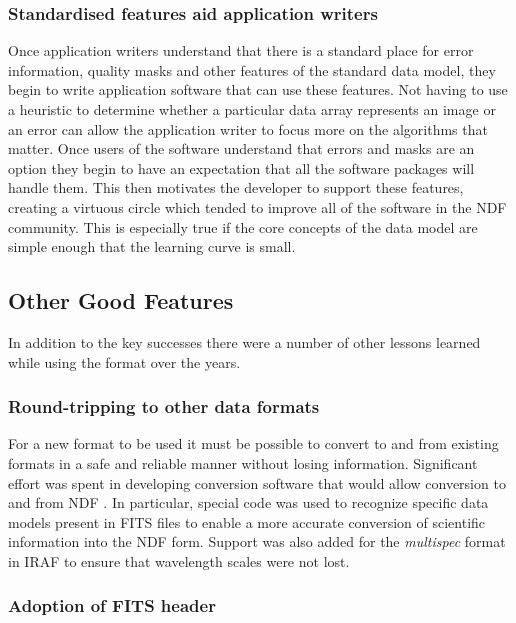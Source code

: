 \documentclass[final,authoryear,5p,times,twocolumn]{elsarticle}
\begin{document}
\subsubsection{Standardised features aid application writers}

Once application writers understand that there is a standard place for
error information, quality masks and other features of the standard
data model, they begin to write application software that can use
these features. Not having to use a heuristic to determine whether a
particular data array represents an image or an error can allow the
application writer to focus more on the algorithms that matter. Once
users of the software understand that errors and masks are an option
they begin to have an expectation that all the software packages will
handle them. This then motivates the developer to support these
features, creating a virtuous circle which tended to improve all of
the software in the NDF community.
This is especially true if the core concepts of the data
model are simple enough that the learning curve is small.

\subsection{Other Good Features}

In addition to the key successes there were a number of
other lessons learned while using the format over the years.

\subsubsection{Round-tripping to other data formats}

For a new format to be used it must be possible to
convert to and from existing formats in a safe and reliable manner
without losing information.
Significant effort was spent in developing conversion software that
would allow conversion to and from NDF
\citep{SUN55,1997STARB..19...14C}. In particular, special code was
used to recognize specific data models present in FITS files to enable
a more accurate conversion of scientific information into the NDF
form. Support was also added for the \emph{multispec} format in IRAF
\citep{1993ASPC...52..467V} to ensure that wavelength scales were not
lost.

\subsubsection{Adoption of FITS header}
\end{document}
